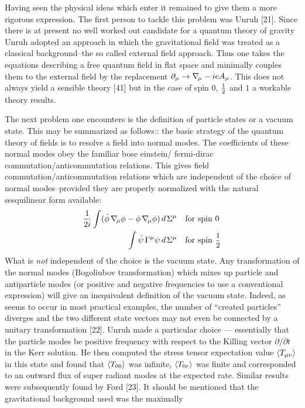 Having seen the physical ideas which enter it remained to give them a
more rigorous expression. The first person to tackle this problem was
Unruh [21]. Since there is at present no well worked out candidate for a quantum theory
of gravity Unruh adopted an approach in which the gravitational field was treated as
a classical background--the so called external field approach. Thus one takes
the equations describing a free quantum field in flat space and minimally
couples them to the external field by the replacement $\partial_\mu \to \grad_\mu - ieA_\mu$.
This does not always yield a sensible theory [41] but in the case of spin 0, $\small{\frac{1}{2}}$ and $1$ a workable
theory results.

The next problem one encounters is the definition of particle states or a
vacuum state. This may be summarized as follows:: the basic strategy of the quantum theory of fields 
is to resolve a field into normal modes. The coefficients
of these normal modes obey the familiar bose einstein/ fermi-dirac commutation/anticommutation
relations. This gives field commutation/anticommutation relations which are independent
of the choice of normal modes--provided they are properly normalized with the
natural sesquilinear form available:
\begin{align}
\frac{1}{2i} \int (\bar\phi\grad_\mu\phi - \phi\grad_\mu\phi) \,d\mskip 2mu\Sigma^\mu \quad & \text{for spin 0}\\
\int \bar\psi\GG^\mu\psi \,d\mskip 2mu\Sigma^\mu \quad & \text{for spin \small$\half$}
\end{align}
What is {\it not} independent of the choice is the vacuum state. Any transformation
of the normal modes (Bogoliubov transformation) which mixes up particle and
antiparticle modes (or positive and negative frequencies to use a conventional expression)
will give an inequivalent definition of the vacuum state. Indeed, as
seems to occur in most practical examples, the number of ``created particles'' diverges and
the two different state vectors may not even be connected by a unitary transformation [22].
Unruh made a particular choice --- essentially that the particle modes be positive
frequency with respect to the Killing vector $\partial/\partial t$ in the Kerr solution.
He then computed the stress tensor expectation value $\langle T_{\mu\nu} \rangle$ in this state and found
that $\langle T_{00} \rangle$ was infinite, $\langle T_{0r} \rangle$ was finite and corresponded to an outward flux of
super radiant modes at the expected rate. Similar results were subsequently found by Ford [23].
It should be mentioned that the gravitational background used was the maximally
